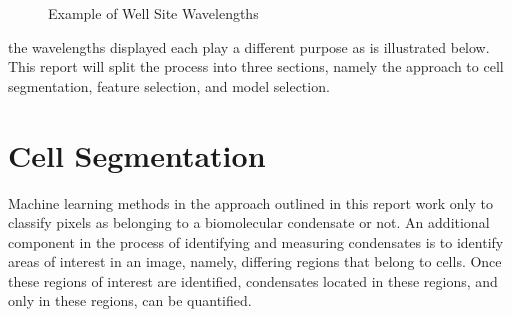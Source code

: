 \documentclass[11pt]{article}
\begin{document}
\begin{figure}[H]
    \centering
    {
    }\caption{Example of Well Site Wavelengths}
    \label{fig:wavelengths}
\end{figure}

\noindent the wavelengths displayed each play a different purpose as is illustrated below. This
report will split the process into three sections, namely the approach to cell segmentation, feature
selection, and model selection. 


\section{Cell Segmentation}

Machine learning methods in the approach outlined in this report work only to classify pixels as
belonging to a biomolecular condensate or not. An additional component in the process of identifying
and measuring condensates is to identify areas of interest in an image, namely, differing regions
that belong to cells. Once these regions of interest are identified, condensates located in these
regions, and only in these regions, can be quantified.
\end{document}
